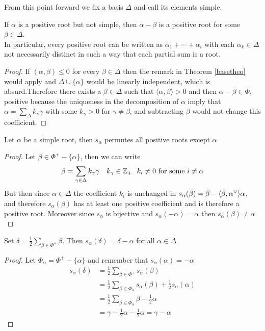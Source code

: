 From this point forward we fix a basis $\Delta$ and call its elements simple.
\begin{lema}
	If $\alpha$ is a positive root but not simple, then $\alpha-\beta$ is a positive root for some $\beta \in \Delta$.\\
	In particular, every positive root can be written as $\alpha_1+\cdots +\alpha_i$ with each $\alpha_k \in \Delta$ not necessarily distinct in such a way that each partial sum is a root.
	\label{partialsum}
\end{lema}
\begin{proof}
	If $(\alpha,\beta)\le 0$ for every $\beta \in \Delta$ then the remark in Theorem \ref{basetheo} would apply and $\Delta \cup \{\alpha\}$ would be linearly independent, which is absurd.Therefore there exists a $\beta \in \Delta$ such that $\langle \alpha,\beta \rangle > 0$ and then $\alpha-\beta \in \Phi$, positive because the uniqueness in the decomposition of $\alpha$ imply that $\alpha = \sum_\Delta k_\gamma \gamma$ with some $k_\gamma > 0$ for $\gamma \not=\beta$, and subtracting $\beta$ would not change this coefficient.
\end{proof}
\begin{lema}
	Let $\alpha$ be a simple root, then $s_\alpha$ permutes all positive roots except $\alpha$
	\label{permutepositive}
\end{lema}
\begin{proof}
	Let $\beta \in \Phi^+ - \{\alpha\}$, then we can write 
	$$ \beta = \sum_{\gamma \in \Delta} k_\gamma \gamma \ \ \ k_\gamma \in \mathbb{Z}_+ \ \ k_i \not=0 \text{ for some }\\i\not=\alpha$$
	But then since $\alpha \in \Delta$ the coefficient $k_i$ is unchanged in $s_\alpha(\beta) = \beta - \langle {\beta},{\alpha}^\lor\rangle\alpha$, and therefore $s_\alpha(\beta)$ has at least one positive coefficient and is therefore a positive root. Moreover since $s_\alpha$ is bijective and $s_\alpha(-\alpha)=\alpha$ then $s_\alpha(\beta)\not=\alpha$ 
\end{proof}
\begin{corol}
	Set $\delta = \displaystyle \frac{1}{2}\sum_{\beta \in \Phi^+} \beta$. Then $s_\alpha(\delta) = \delta - \alpha$ for all $\alpha \in \Delta$
	\label{corolexistancedelta}
\end{corol}
\begin{proof}
	Let $\Phi_\alpha = \Phi^+-\{\alpha\}$ and remember that $s_\alpha(\alpha)=-\alpha$
	\begin{align*}
		s_\alpha(\delta) &= \displaystyle \frac{1}{2}\sum_{\beta \in \Phi^+} s_\alpha(\beta)\\
		&= \displaystyle \frac{1}{2}\sum_{\beta \in \Phi_\alpha}  s_\alpha(\beta) + \frac{1}{2}s_\alpha(\alpha)\\
		&= \frac{1}{2}\sum_{\beta \in \Phi_\alpha} \beta - \frac{1}{2}\alpha\\
		&= \gamma - \frac{1}{2}\alpha - \frac{1}{2} \alpha = \gamma-\alpha
	\end{align*}
\end{proof}

